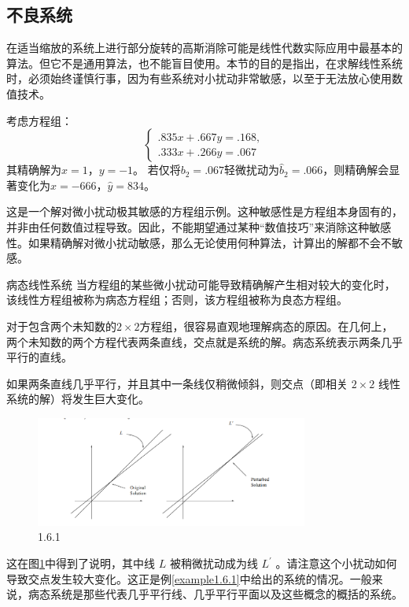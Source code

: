 \subsection{不良系统}

在适当缩放的系统上进行部分旋转的高斯消除可能是线性代数实际应用中最基本的算法。但它不是通用算法，也不能盲目使用。本节的目的是指出，在求解线性系统时，必须始终谨慎行事，因为有些系统对小扰动非常敏感，以至于无法放心使用数值技术。

\begin{example}
\label{example1.6.1}
考虑方程组：
$$
\begin{cases} 
.835x + .667y = .168, \\
.333x + .266y = .067
\end{cases}
$$
其精确解为$x=1$，$y=-1$。
若仅将$b_2=.067$轻微扰动为$\hat{b}_2=.066$，则精确解会显著变化为$\hat{x}=-666$，$\hat{y}=834$。
\end{example}
这是一个解对微小扰动极其敏感的方程组示例。这种敏感性是方程组本身固有的，并非由任何数值过程导致。因此，不能期望通过某种“数值技巧”来消除这种敏感性。如果精确解对微小扰动敏感，那么无论使用何种算法，计算出的解都不会不敏感。

\begin{bluebox}{病态线性系统}
当方程组的某些微小扰动可能导致精确解产生相对较大的变化时，该线性方程组被称为病态方程组；否则，该方程组被称为良态方程组。    
\end{bluebox}

对于包含两个未知数的$2\times2$方程组，很容易直观地理解病态的原因。在几何上，两个未知数的两个方程代表两条直线，交点就是系统的解。病态系统表示两条几乎平行的直线。

如果两条直线几乎平行，并且其中一条线仅稍微倾斜，则交点（即相关 $2\times2$ 线性系统的解）将发生巨大变化。

\begin{figure}
    \centering
    \includegraphics[width=0.8\textwidth]{images/fig1.6.1.png}
    \caption{1.6.1}
    \label{figure1.6.1}
\end{figure}

这在图\ref{figure1.6.1}中得到了说明，其中线 $L$ 被稍微扰动成为线 $L^{\prime}$ 。请注意这个小扰动如何导致交点发生较大变化。这正是例\ref{example1.6.1}中给出的系统的情况。一般来说，病态系统是那些代表几乎平行线、几乎平行平面以及这些概念的概括的系统。

